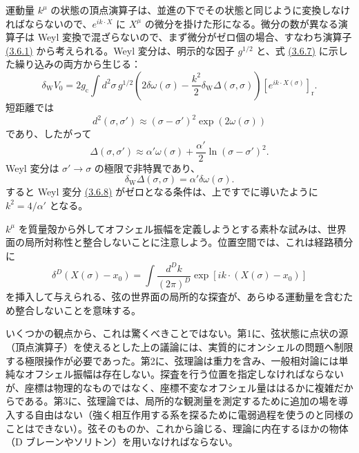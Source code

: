 運動量 $k^\mu$ の状態の頂点演算子は、並進の下でその状態と同じように変換しなければならないので、$e^{ik\cdot X}$ に $X^\mu$ の微分を掛けた形になる。微分の数が異なる演算子は Weyl 変換で混ざらないので、まず微分がゼロ個の場合、すなわち演算子 \hyperref[eq:3.6.1]{(3.6.1)} から考えられる。Weyl 変分は、明示的な因子 $g^{1/2}$ と、式 \hyperref[eq:3.6.7]{(3.6.7)} に示した繰り込みの両方から生じる：
\begin{equation}
\delta_{\mathrm W}V_0
=2g_{\mathrm c}\int d^2\sigma\,g^{1/2}
\left(2\delta\omega(\sigma)
-\frac{k^2}{2}\delta_{\mathrm W}\Delta(\sigma,\sigma)\right)
[e^{ik\cdot X(\sigma)}]_{\mathrm r}.
\tag{3.6.8}\label{eq:3.6.8}
\end{equation}
短距離では
\begin{equation}
d^2(\sigma,\sigma')\approx
(\sigma-\sigma')^2\exp(2\omega(\sigma))
\tag{3.6.9}\label{eq:3.6.9}
\end{equation}
であり、したがって
\begin{equation}
\Delta(\sigma,\sigma')\approx
\alpha'\omega(\sigma)+\frac{\alpha'}2\ln(\sigma-\sigma')^2.
\tag{3.6.10}\label{eq:3.6.10}
\end{equation}
Weyl 変分は $\sigma'\to\sigma$ の極限で非特異であり、
\begin{equation}
\delta_{\mathrm W}\Delta(\sigma,\sigma)=\alpha'\delta\omega(\sigma).
\tag{3.6.11}\label{eq:3.6.11}
\end{equation}
すると Weyl 変分 \hyperref[eq:3.6.8]{(3.6.8)} がゼロとなる条件は、上ですでに導いたように $k^2=4/\alpha'$ となる。


$k^\mu$ を質量殻から外してオフシェル振幅を定義しようとする素朴な試みは、世界面の局所対称性と整合しないことに注意しよう。位置空間では、これは経路積分に
\begin{equation}
\delta^D(X(\sigma)-x_0)=
\int\frac{d^Dk}{(2\pi)^D}
\exp[ik\cdot(X(\sigma)-x_0)]
\tag{3.6.12}\label{eq:3.6.12}
\end{equation}
を挿入して与えられる、弦の世界面の局所的な探査が、あらゆる運動量を含むため整合しないことを意味する。

いくつかの観点から、これは驚くべきことではない。第1に、弦状態に点状の源（頂点演算子）を使えるとした上の議論には、実質的にオンシェルの問題へ制限する極限操作が必要であった。第2に、弦理論は重力を含み、一般相対論には単純なオフシェル振幅は存在しない。探査を行う位置を指定しなければならないが、座標は物理的なものではなく、座標不変なオフシェル量ははるかに複雑だからである。第3に、弦理論では、局所的な観測量を測定するために追加の場を導入する自由はない（強く相互作用する系を探るために電弱過程を使うのと同様のことはできない）。弦そのものか、これから論じる、理論に内在するほかの物体（D ブレーンやソリトン）を用いなければならない。


